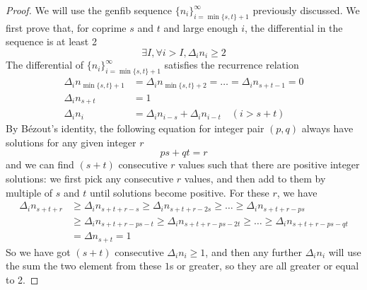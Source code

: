 \documentclass[]{article}
\begin{document}
\begin{proof}
	We will use the genfib sequence $\{n_i\}_{i=\min\{s,t\}+1}^{\infty}$ previously discussed. We first prove that, for coprime $s$ and $t$ and large enough $i$, the differential in the sequence is at least 2
	\[
	\exists I, \forall i>I, \Delta_i n_{i} \ge 2
	\]
	The differential of $\{n_i\}_{i=\min\{s,t\}+1}^{\infty}$ satisfies the recurrence relation
	\begin{align*}
	\Delta_i n_{\min\{s,t\}+1} &= \Delta_i n_{\min\{s,t\}+2} = \dots = \Delta_i n_{s+t-1} = 0\\
	\Delta_i n_{s+t} &= 1\\
	\Delta_i n_i &= \Delta_i n_{i-s} + \Delta_i n_{i-t} \quad (i > s + t)
	\end{align*}
	By Bézout's identity, the following equation for integer pair $(p, q)$ always have solutions for any given integer $r$
	\[
	ps + qt = r
	\]
	and we can find $(s + t)$ consecutive $r$ values such that there are positive integer solutions: we first pick any consecutive $r$ values, and then add to them by multiple of $s$ and $t$ until solutions become positive. For these $r$, we have
	\begin{align*}
	\Delta_i n_{s+t+r} &\geq \Delta_i n_{s+t+r - s} \geq \Delta_i n_{s+t+r - 2s} \geq\dots \geq \Delta_i  n_{s+t+r - ps} \\
		&\geq \Delta_i n_{s+t+r - ps - t} \geq \Delta_i n_{s+t+r - ps - 2t} \geq\dots \geq \Delta_i  n_{s+t+r - ps - qt} \\
		&= \Delta n_{s+t} = 1
	\end{align*}
	So we have got $(s + t)$ consecutive $\Delta_i n_i\geq 1$, and then any further $\Delta_i n_i$ will use the sum the two element from these $1$s or greater, so they are all greater or equal to 2.


\end{proof}
\end{document}
